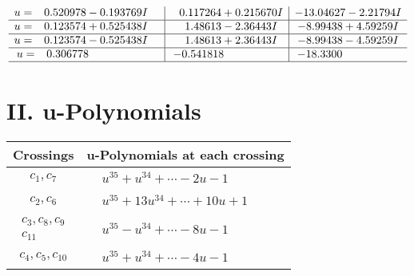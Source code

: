 \documentclass[1p]{elsarticle_modified}
\theoremstyle{definition}
\begin{document}
$$\begin{array}{c|c|c}
\begin{aligned}
u &= \phantom{-}0.520978 - 0.193769 I\end{aligned}
 & \phantom{-}0.117264 + 0.215670 I & -13.04627 - 2.21794 I \\ \hline\begin{aligned}
u &= \phantom{-}0.123574 + 0.525438 I\end{aligned}
 & \phantom{-}1.48613 - 2.36443 I & -8.99438 + 4.59259 I \\ \hline\begin{aligned}
u &= \phantom{-}0.123574 - 0.525438 I\end{aligned}
 & \phantom{-}1.48613 + 2.36443 I & -8.99438 - 4.59259 I \\ \hline\begin{aligned}
u &= \phantom{-}0.306778\phantom{ +0.000000I}\end{aligned}
 & -0.541818\phantom{ +0.000000I} & -18.3300\phantom{ +0.000000I}\\
 \hline 
 \end{array}$$\newpage
\newpage\renewcommand{\arraystretch}{1}
\centering \section*{ II. u-Polynomials}
\begin{tabular}{m{50pt}|m{274pt}}
Crossings & \hspace{64pt}u-Polynomials at each crossing \\
\hline $$\begin{aligned}c_{1},c_{7}\end{aligned}$$&$\begin{aligned}
&u^{35}+u^{34}+\cdots-2 u-1
\end{aligned}$\\
\hline $$\begin{aligned}c_{2},c_{6}\end{aligned}$$&$\begin{aligned}
&u^{35}+13 u^{34}+\cdots+10 u+1
\end{aligned}$\\
\hline $$\begin{aligned}c_{3},c_{8},c_{9}\\c_{11}\end{aligned}$$&$\begin{aligned}
&u^{35}- u^{34}+\cdots-8 u-1
\end{aligned}$\\
\hline $$\begin{aligned}c_{4},c_{5},c_{10}\end{aligned}$$&$\begin{aligned}
&u^{35}+u^{34}+\cdots-4 u-1
\end{aligned}$\\
\hline
\end{tabular}\newpage\renewcommand{\arraystretch}{1}
\end{document}
